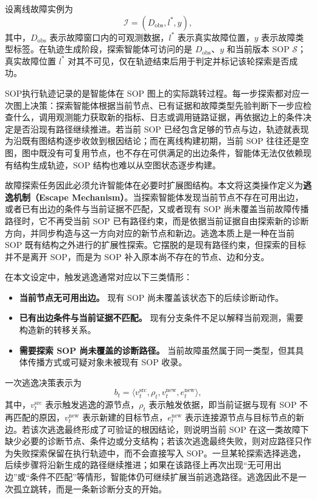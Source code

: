 设离线故障实例为
\[
\mathcal{I}=(D_{\text{obs}},l^{*},y),
\]
其中，$D_{\text{obs}}$ 表示故障窗口内的可观测数据，$l^{*}$ 表示真实故障位置，$y$ 表示故障类型标签。在轨迹生成阶段，探索智能体可访问的是 $D_{\text{obs}}$、$y$ 和当前版本 SOP $\mathcal{S}$；真实故障位置 $l^{*}$ 对其不可见，仅在轨迹结束后用于判定并标记该轮探索是否成功。

SOP执行轨迹记录的是智能体在 SOP 图上的实际跳转过程。每一步探索都对应一次图上决策：探索智能体根据当前节点、已有证据和故障类型先验判断下一步应检查什么，调用观测能力获取新的指标、日志或调用链路证据，再依据边上的条件决定是否沿现有路径继续推进。若当前 SOP 已经包含足够的节点与边，轨迹就表现为沿既有图结构逐步收敛到根因结论；而在离线构建初期，当前 SOP 往往还是空图，图中既没有可复用节点，也不存在可供满足的出边条件，智能体无法仅依赖现有结构生成轨迹，SOP 结构也难以从空图状态逐步构建。

故障探索任务因此必须允许智能体在必要时扩展图结构。本文将这类操作定义为\textbf{逃逸机制（Escape Mechanism）}。当探索智能体发现当前节点不存在可用出边，或者已有出边的条件与当前证据不匹配，又或者现有 SOP 尚未覆盖当前故障传播路径时，它不再受当前 SOP 已有路径约束，而是依据当前证据自由探索新的诊断方向，并同步构造与这一方向对应的新节点和新边。逃逸本质上是一种在当前 SOP 既有结构之外进行的扩展性探索。它摆脱的是现有路径约束，但探索的目标并不是离开 SOP，而是为 SOP 补入原本尚不存在的节点、边和分支。

在本文设定中，触发逃逸通常对应以下三类情形：

\begin{itemize}
    \item \textbf{当前节点无可用出边。} 现有 SOP 尚未覆盖该状态下的后续诊断动作。
    \item \textbf{已有出边条件与当前证据不匹配。} 现有分支条件不足以解释当前观测，需要构造新的转移关系。
    \item \textbf{需要探索 SOP 尚未覆盖的诊断路径。} 当前故障虽然属于同一类型，但其具体传播方式或可疑对象未被现有 SOP 收录。
\end{itemize}

一次逃逸决策表示为
\[
b_t=\langle v_t^{\mathrm{src}},\rho_t,v_t^{\mathrm{new}},e_t^{\mathrm{new}}\rangle,
\]
其中，$v_t^{\mathrm{src}}$ 表示触发逃逸的源节点，$\rho_t$ 表示触发依据，即当前证据与现有 SOP 不再匹配的原因，$v_t^{\mathrm{new}}$ 表示新建的目标节点，$e_t^{\mathrm{new}}$ 表示连接源节点与目标节点的新边。若该次逃逸最终形成了可验证的根因结论，则说明当前 SOP 在这一类故障下缺少必要的诊断节点、条件边或分支结构；若该次逃逸最终失败，则对应路径只作为失败探索保留在执行轨迹中，而不会直接写入 SOP。一旦某轮探索选择逃逸，后续步骤将沿新生成的路径继续推进；如果在该路径上再次出现“无可用出边”或“条件不匹配”等情形，智能体仍可继续扩展当前逃逸路径。逃逸因此不是一次孤立跳转，而是一条新诊断分支的开始。

